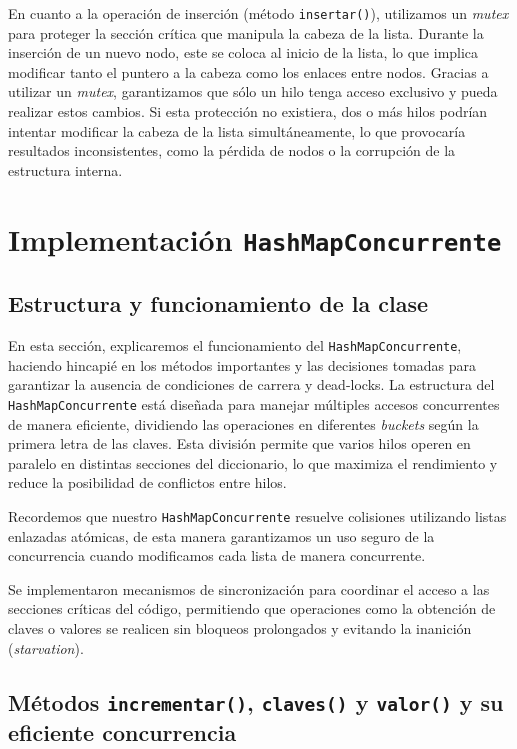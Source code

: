 \documentclass[a4paper]{article}
\begin{document}
    En cuanto a la operación de inserción (método \texttt{insertar()}), utilizamos un \textit{mutex} para proteger la sección crítica que manipula la cabeza de la lista. Durante la inserción de un nuevo nodo, este se coloca al inicio de la lista, lo que implica modificar tanto el puntero a la cabeza como los enlaces entre nodos. Gracias a utilizar un \textit{mutex}, garantizamos que sólo un hilo tenga acceso exclusivo y pueda realizar estos cambios. Si esta protección no existiera, dos o más hilos podrían intentar modificar la cabeza de la lista simultáneamente, lo que provocaría resultados inconsistentes, como la pérdida de nodos o la corrupción de la estructura interna.


\section{Implementación \texttt{HashMapConcurrente}}

    \subsection{Estructura y funcionamiento de la clase}

    En esta sección, explicaremos el funcionamiento del \texttt{HashMapConcurrente}, haciendo hincapié en los métodos importantes y las decisiones tomadas para garantizar la ausencia de condiciones de carrera y dead-locks. La estructura del \texttt{HashMapConcurrente} está diseñada para manejar múltiples accesos concurrentes de manera eficiente, dividiendo las operaciones en diferentes \textit{buckets} según la primera letra de las claves. Esta división permite que varios hilos operen en paralelo en distintas secciones del diccionario, lo que maximiza el rendimiento y reduce la posibilidad de conflictos entre hilos.

    Recordemos que nuestro \texttt{HashMapConcurrente} resuelve colisiones utilizando listas enlazadas atómicas, de esta manera garantizamos un uso seguro de la concurrencia cuando modificamos cada lista de manera concurrente.

    Se implementaron mecanismos de sincronización para coordinar el acceso a las secciones críticas del código, permitiendo que operaciones como la obtención de claves o valores se realicen sin bloqueos prolongados y evitando la inanición (\textit{starvation}).

    \subsection{Métodos \texttt{incrementar()}, \texttt{claves()} y \texttt{valor()} y su eficiente concurrencia}
\end{document}
